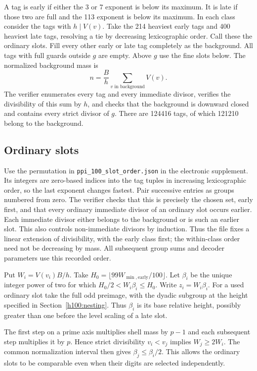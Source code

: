 \documentclass[11pt]{article}
\numberwithin{equation}{section}
\theoremstyle{definition}
\theoremstyle{remark}
\begin{document}
A tag is early if either the 3 or 7 exponent is below its maximum. It is late if those two are full and the 113 exponent is below its maximum. In each class consider the tags with \(h\mid V(v)\). Take the 214 heaviest early tags and 400 heaviest late tags, resolving a tie by decreasing lexicographic order. Call these the ordinary slots. Fill every other early or late tag completely as the background. All tags with full guards outside \(g\) are empty. Above \(g\) use the fine slots below. The normalized background mass is \[
 n=\frac Bh\sum_{v\text{ in background}} V(v).
\] The verifier enumerates every tag and every immediate divisor, verifies the divisibility of this sum by \(h\), and checks that the background is downward closed and contains every strict divisor of \(g\). There are 124416 tags, of which 121210 belong to the background.

\subsection{Ordinary slots}\label{ordinary-slots}

Use the permutation in \texttt{ppi\_100\_slot\_order.json} in the electronic supplement. Its integers are zero-based indices into the tag tuples in increasing lexicographic order, so the last exponent changes fastest. Pair successive entries as groups numbered from zero. The verifier checks that this is precisely the chosen set, early first, and that every ordinary immediate divisor of an ordinary slot occurs earlier. Each immediate divisor either belongs to the background or is such an earlier slot. This also controls non-immediate divisors by induction. Thus the file fixes a linear extension of divisibility, with the early class first; the within-class order need not be decreasing by mass. All subsequent group sums and decoder parameters use this recorded order.

Put \(W_i=V(v_i)B/h\). Take \(H_0=\lfloor 99 W_{\min,\mathrm{early}}/100\rfloor\). Let \(\beta_i\) be the unique integer power of two for which \(H_0/2<W_i\beta_i\le H_0\). Write \(z_i=W_i\beta_i\). For a used ordinary slot take the full odd preimage, with the dyadic subgroup at the height specified in Section~\ref{h100:nesting}. Thus \(\beta_i\) is its base relative height, possibly greater than one before the level scaling of a late slot.

The first step on a prime axis multiplies shell mass by \(p-1\) and each subsequent step multiplies it by \(p\). Hence strict divisibility \(v_i<v_j\) implies \(W_j\ge 2W_i\). The common normalization interval then gives \(\beta_j\le\beta_i/2\). This allows the ordinary slots to be comparable even when their digits are selected independently.
\end{document}
